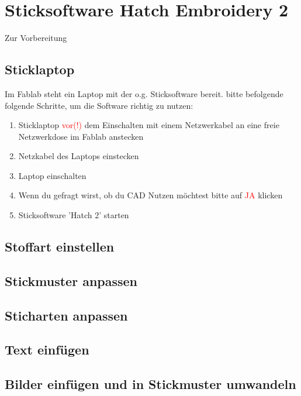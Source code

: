 \documentclass{\basedir/fablab-document}
\begin{document}
\section{Sticksoftware Hatch Embroidery 2}

Zur Vorbereitung 

\subsection{Sticklaptop}

	Im Fablab steht ein Laptop mit der o.g. Sticksoftware bereit. bitte befolgende folgende Schritte, um die Software richtig zu nutzen:

	\begin{enumerate}
		\item Sticklaptop \textcolor{red}{vor(!)} dem Einschalten mit einem Netzwerkabel an eine freie Netzwerkdose im Fablab anstecken
		\item Netzkabel des Laptops einstecken
		\item Laptop einschalten
		\item Wenn du gefragt wirst, ob du CAD Nutzen möchtest bitte auf \textcolor{red}{JA} klicken
		\item Sticksoftware 'Hatch 2' starten
	\end{enumerate}

\subsection{Stoffart einstellen}

\subsection{Stickmuster anpassen}

\subsection{Sticharten anpassen}

\subsection{Text einfügen}

\subsection{Bilder einfügen und in Stickmuster umwandeln}

\pagebreak
\end{document}

